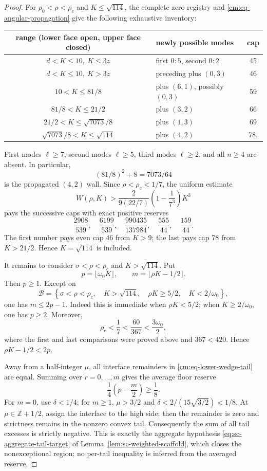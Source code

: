 \documentclass[11pt]{article}
\numberwithin{equation}{section}
\theoremstyle{definition}
\theoremstyle{remark}
\begin{document}
\begin{proof}
For \(\rho_0<\rho<\rho_c\) and \(K\leq\sqrt{114}\), the complete zero
registry and \eqref{cm:eq-angular-propagation} give the following exhaustive
inventory:
\begin{center}
\small
\begin{tabular}{c|l|c}
range (lower face open, upper face closed)&newly possible modes&cap\\ \hline
\(d<K\leq10,\ K\leq3z\)&first \(0{:}5\), second \(0{:}2\)&45\\
\(d<K\leq10,\ K>3z\)&preceding plus \((0,3)\)&46\\
\(10<K\leq81/8\)&plus \((6,1)\), possibly \((0,3)\)&59\\
\(81/8<K\leq21/2\)&plus \((3,2)\)&66\\
\(21/2<K\leq\sqrt{7073}/8\)&plus \((1,3)\)&69\\
\(\sqrt{7073}/8<K\leq\sqrt{114}\)&plus \((4,2)\)&78.
\end{tabular}
\end{center}
First modes \(\ell\geq7\), second modes \(\ell\geq5\), third modes
\(\ell\geq2\), and all \(n\geq4\) are absent.  In particular,
\[
 (81/8)^2+8=7073/64
\]
is the propagated \((4,2)\) wall.  Since \(\rho<\rho_c<1/7\), the
uniform estimate
\[
 W(\rho,K)>
 \frac{2}{9(22/7)}\left(1-\frac1{7^3}\right)K^3
\]
pays the successive caps with exact positive reserves
\[
 \frac{2908}{539},\quad\frac{6199}{539},\quad
 \frac{990435}{137984},\quad\frac{555}{44},\quad\frac{159}{44}.
\]
The first number pays even cap \(46\) from \(K>9\); the last pays cap
\(78\) from \(K>21/2\).  Hence \(K=\sqrt{114}\) is included.

It remains to consider \(\sigma<\rho<\rho_c\) and
\(K>\sqrt{114}\).  Put
\[
 p=\lfloor\omega_0K\rfloor,\qquad
 m=\lfloor\rho K-1/2\rfloor.
\]
Then \(p\geq1\).  Except on
\begin{equation}
 \mathcal B=\left\{\sigma<\rho<\rho_c,\quad K>\sqrt{114},\quad
 \rho K\geq5/2,\quad K<2/\omega_0\right\},
 \label{cm:eq-exceptional-B}
\end{equation}
one has \(m\leq2p-1\).  Indeed this is immediate when \(\rho K<5/2\);
when \(K\geq2/\omega_0\), one has \(p\geq2\).  Moreover,
\[
 \rho_c<\frac17<\frac{60}{367}<\frac{3\omega_0}{2},
\]
where the first and last comparisons were proved above and
\(367<420\).  Hence \(\rho K-1/2<2p\).

Away from a half-integer \(\mu\), all interface remainders in
\eqref{cm:eq-lower-wedge-tail} are equal.  Summing over
\(r=0,\ldots,m\) gives the average floor reserve
\[
 \frac14\left(p-\frac m2\right)\geq\frac18.
\]
For \(m=0\), use \(\delta<1/4\); for \(m\geq1\), \(\mu>3/2\) and
\(\delta<2/(15\sqrt{3/2})<1/8\).  At
\(\mu\in\mathbb Z+1/2\), assign the interface to the high side; then the
remainder is zero and strictness remains in the nonzero convex tail.
Consequently the sum of all tail excesses is strictly negative.  This is
exactly the aggregate hypothesis \eqref{eq:sc-aggregate-tail-target} of
Lemma~\ref{lem:sc-weighted-scaffold}, which closes the nonexceptional
region; no per-tail inequality is inferred from the averaged reserve.


\end{proof}
\end{document}
